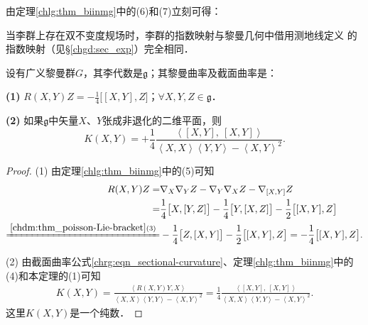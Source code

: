 由定理\ref{chlg:thm_biinmg}中的(6)和(7)立刻可得：
\begin{corollary}\label{chlg:thm_expiso}
    当李群上存在双不变度规场时，李群的指数映射与黎曼几何中借用测地线定义
    的指数映射（见\S\ref{chgd:sec_exp}）完全相同．
\end{corollary}

\begin{theorem}\label{chlg:thm_riemann-section-curvature}
    设有广义黎曼群$G$，其李代数是$\mathfrak{g}$；其黎曼曲率及截面曲率是：
    
    {\bfseries (1)} $R(X,Y)Z=-\frac{1}{4}\bigl[[X,Y],Z\bigr]$；$ \forall X,Y,Z\in \mathfrak{g}$．
    
    {\bfseries (2)} 如果$\mathfrak{g}$中矢量$X$、$Y$张成非退化的二维平面，则
    \begin{equation}
        K(X,Y)=+\frac{1}{4} \frac{\left<[X,Y],\  [X,Y]\right>}
        {\left<X,X\right>\left<Y,Y\right>-\left<X,Y\right>^2} .
    \end{equation}
\end{theorem}
\begin{proof}
    (1) 由定理\ref{chlg:thm_biinmg}中的(5)可知
    \begin{align*}
        R(X,Y)Z =& \nabla_X \nabla_Y Z - \nabla_Y \nabla_X Z - \nabla_{[X,Y]} Z \\
        =&  \frac{1}{4} \bigl[X, [Y,Z]\bigr] - \frac{1}{4} \bigl[Y, [X,Z]\bigr]
        -\frac{1}{2} \bigl[[X,Y],Z\bigr] \\
        \xlongequal{\ref{chdm:thm_poisson-Lie-bracket}(3)}&
        -\frac{1}{4} \bigl[Z, [X,Y]\bigr] -\frac{1}{2} \bigl[[X,Y],Z\bigr] 
        =  -\frac{1}{4} \bigl[[X,Y],Z\bigr] .
    \end{align*}
    
    (2) 由截面曲率公式\eqref{chrg:eqn_sectional-curvature}、定理\ref{chlg:thm_biinmg}中的(4)和本定理的(1)可知
    \begin{align*}
        K(X,Y) %
        = \frac{\left<R(X,Y)Y,X\right> } {\left<X,X\right>\left<Y,Y\right>-\left<X,Y\right>^2} %
        = \frac{1}{4} \frac{\left<[X,Y],\  [X,Y]\right>}
        {\left<X,X\right>\left<Y,Y\right>-\left<X,Y\right>^2} .
    \end{align*}
    这里$K (X, Y)$是一个纯数．
\end{proof}











